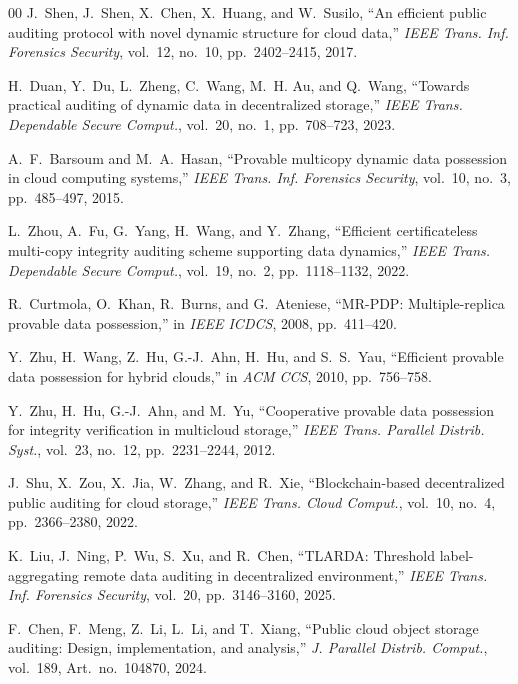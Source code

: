 \documentclass[lettersize,journal]{IEEEtran}
\begin{document}
\begin{thebibliography}{00}
J.~Shen, J.~Shen, X.~Chen, X.~Huang, and W.~Susilo,
``An efficient public auditing protocol with novel dynamic structure for cloud data,''
\emph{IEEE Trans. Inf. Forensics Security}, vol.~12, no.~10, pp.~2402--2415, 2017.

H.~Duan, Y.~Du, L.~Zheng, C.~Wang, M.~H. Au, and Q.~Wang,
``Towards practical auditing of dynamic data in decentralized storage,''
\emph{IEEE Trans. Dependable Secure Comput.}, vol.~20, no.~1, pp.~708--723, 2023.

A.~F.~Barsoum and M.~A.~Hasan,
``Provable multicopy dynamic data possession in cloud computing systems,''
\emph{IEEE Trans. Inf. Forensics Security}, vol.~10, no.~3, pp.~485--497, 2015.

L.~Zhou, A.~Fu, G.~Yang, H.~Wang, and Y.~Zhang,
``Efficient certificateless multi-copy integrity auditing scheme supporting data dynamics,''
\emph{IEEE Trans. Dependable Secure Comput.}, vol.~19, no.~2, pp.~1118--1132, 2022.

R.~Curtmola, O.~Khan, R.~Burns, and G.~Ateniese,
``MR-PDP: Multiple-replica provable data possession,''
in \emph{IEEE ICDCS}, 2008, pp.~411--420.

Y.~Zhu, H.~Wang, Z.~Hu, G.-J.~Ahn, H.~Hu, and S.~S.~Yau,
``Efficient provable data possession for hybrid clouds,''
in \emph{ACM CCS}, 2010, pp.~756--758.

Y.~Zhu, H.~Hu, G.-J.~Ahn, and M.~Yu,
``Cooperative provable data possession for integrity verification in multicloud storage,''
\emph{IEEE Trans. Parallel Distrib. Syst.}, vol.~23, no.~12, pp.~2231--2244, 2012.

J.~Shu, X.~Zou, X.~Jia, W.~Zhang, and R.~Xie,
``Blockchain-based decentralized public auditing for cloud storage,''
\emph{IEEE Trans. Cloud Comput.}, vol.~10, no.~4, pp.~2366--2380, 2022.

K.~Liu, J.~Ning, P.~Wu, S.~Xu, and R.~Chen,
``TLARDA: Threshold label-aggregating remote data auditing in decentralized environment,''
\emph{IEEE Trans. Inf. Forensics Security}, vol.~20, pp.~3146--3160, 2025.

F.~Chen, F.~Meng, Z.~Li, L.~Li, and T.~Xiang,
``Public cloud object storage auditing: Design, implementation, and analysis,''
\emph{J. Parallel Distrib. Comput.}, vol.~189, Art.~no.~104870, 2024.


\end{thebibliography}
\end{document}

